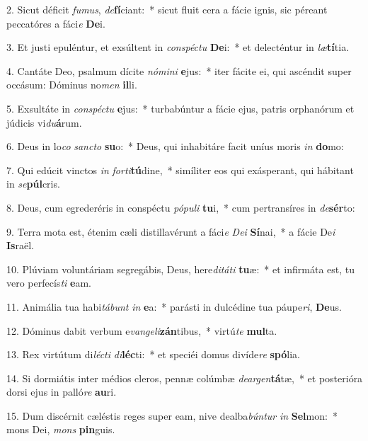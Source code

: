 2. Sicut déficit \textit{fu}\textit{mus}, \textit{de}\textbf{fí}ciant:~*  sicut fluit cera a fácie ignis, sic péreant peccatóres a fáci\textit{e} \textbf{De}i.\

3. Et justi epuléntur, et exsúltent in \textit{con}\textit{spéc}\textit{tu} \textbf{De}i:~*  et delecténtur in \textit{læ}\textbf{tí}tia.\

4. Cantáte Deo, psalmum dícite \textit{nó}\textit{mi}\textit{ni} \textbf{e}jus:~*  iter fácite ei, qui ascéndit super occásum: Dóminus no\textit{men} \textbf{il}li.\

5. Exsultáte in \textit{con}\textit{spéc}\textit{tu} \textbf{e}jus:~*  turbabúntur a fácie ejus, patris orphanórum et júdicis vi\textit{du}\textbf{á}rum.\

6. Deus in lo\textit{co} \textit{sanc}\textit{to} \textbf{su}o:~*  Deus, qui inhabitáre facit uníus moris \textit{in} \textbf{do}mo:\

7. Qui edúcit vinctos \textit{in} \textit{for}\textit{ti}\textbf{tú}dine,~*  simíliter eos qui exásperant, qui hábitant in \textit{se}\textbf{púl}cris.\

8. Deus, cum egrederéris in conspéctu \textit{pó}\textit{pu}\textit{li} \textbf{tu}i,~*  cum pertransíres in \textit{de}\textbf{sér}to:\

9. Terra mota est, étenim cæli distillavérunt a fáci\textit{e} \textit{De}\textit{i} \textbf{Sí}nai,~*  a fácie De\textit{i} \textbf{Is}raël.\

10. Plúviam voluntáriam segregábis, Deus, here\textit{di}\textit{tá}\textit{ti} \textbf{tu}æ:~*  et infirmáta est, tu vero perfecís\textit{ti} \textbf{e}am.\

11. Animália tua habi\textit{tá}\textit{bunt} \textit{in} \textbf{e}a:~*  parásti in dulcédine tua páupe\textit{ri}, \textbf{De}us.\

12. Dóminus dabit verbum e\textit{van}\textit{ge}\textit{li}\textbf{zán}tibus,~*  virtú\textit{te} \textbf{mul}ta.\

13. Rex virtútum di\textit{léc}\textit{ti} \textit{di}\textbf{léc}ti:~*  et speciéi domus divíde\textit{re} \textbf{spó}lia.\

14. Si dormiátis inter médios cleros, pennæ colúmbæ \textit{de}\textit{ar}\textit{gen}\textbf{tá}tæ,~*  et posterióra dorsi ejus in palló\textit{re} \textbf{au}ri.\

15. Dum discérnit cæléstis reges super eam, nive dealba\textit{bún}\textit{tur} \textit{in} \textbf{Sel}mon:~*  mons Dei, \textit{mons} \textbf{pin}guis.\


